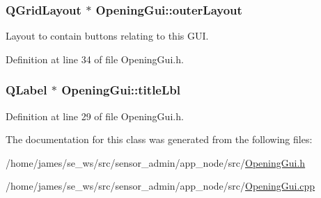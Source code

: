 \hypertarget{class_opening_gui_ae19bf16c0d64f4ae95027e0ffbaa536d}{
\subsubsection[{outer\-Layout}]{\setlength{\rightskip}{0pt plus 5cm}Q\-Grid\-Layout $\ast$ Opening\-Gui\-::outer\-Layout\hspace{0.3cm}{\ttfamily [private]}}}\label{class_opening_gui_ae19bf16c0d64f4ae95027e0ffbaa536d}
Layout to contain buttons relating to this G\-U\-I. 

Definition at line 34 of file Opening\-Gui.\-h.

\hypertarget{class_opening_gui_a41fe7473171f4be873b83c361cfe83d0}{
\subsubsection[{title\-Lbl}]{\setlength{\rightskip}{0pt plus 5cm}Q\-Label $\ast$ Opening\-Gui\-::title\-Lbl\hspace{0.3cm}{\ttfamily [private]}}}\label{class_opening_gui_a41fe7473171f4be873b83c361cfe83d0}


Definition at line 29 of file Opening\-Gui.\-h.



The documentation for this class was generated from the following files\-:\begin{DoxyCompactItemize}
\item 
/home/james/se\-\_\-ws/src/sensor\-\_\-admin/app\-\_\-node/src/\hyperlink{app__node_2src_2_opening_gui_8h}{Opening\-Gui.\-h}\item 
/home/james/se\-\_\-ws/src/sensor\-\_\-admin/app\-\_\-node/src/\hyperlink{app__node_2src_2_opening_gui_8cpp}{Opening\-Gui.\-cpp}\end{DoxyCompactItemize}
